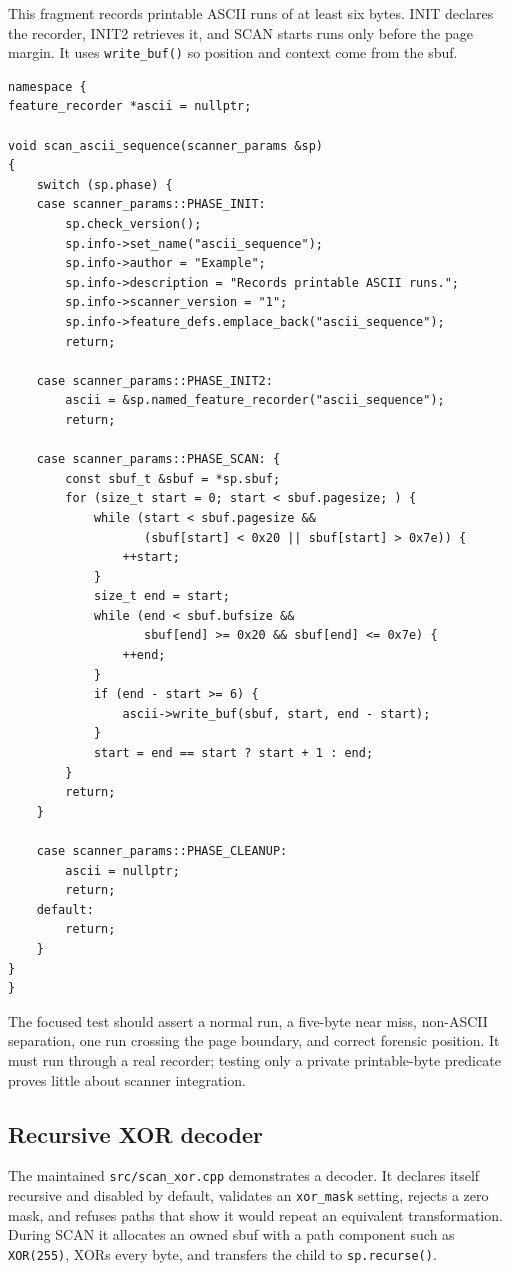 \documentclass[11pt]{article}
\newcommand{\code}[1]{\texttt{#1}}
\begin{document}
This fragment records printable ASCII runs of at least six bytes. INIT declares
the recorder, INIT2 retrieves it, and SCAN starts runs only before the page
margin. It uses \code{write\_buf()} so position and context come from the sbuf.

\begin{Verbatim}[fontsize=\small]
namespace {
feature_recorder *ascii = nullptr;

void scan_ascii_sequence(scanner_params &sp)
{
    switch (sp.phase) {
    case scanner_params::PHASE_INIT:
        sp.check_version();
        sp.info->set_name("ascii_sequence");
        sp.info->author = "Example";
        sp.info->description = "Records printable ASCII runs.";
        sp.info->scanner_version = "1";
        sp.info->feature_defs.emplace_back("ascii_sequence");
        return;

    case scanner_params::PHASE_INIT2:
        ascii = &sp.named_feature_recorder("ascii_sequence");
        return;

    case scanner_params::PHASE_SCAN: {
        const sbuf_t &sbuf = *sp.sbuf;
        for (size_t start = 0; start < sbuf.pagesize; ) {
            while (start < sbuf.pagesize &&
                   (sbuf[start] < 0x20 || sbuf[start] > 0x7e)) {
                ++start;
            }
            size_t end = start;
            while (end < sbuf.bufsize &&
                   sbuf[end] >= 0x20 && sbuf[end] <= 0x7e) {
                ++end;
            }
            if (end - start >= 6) {
                ascii->write_buf(sbuf, start, end - start);
            }
            start = end == start ? start + 1 : end;
        }
        return;
    }

    case scanner_params::PHASE_CLEANUP:
        ascii = nullptr;
        return;
    default:
        return;
    }
}
}
\end{Verbatim}

The focused test should assert a normal run, a five-byte near miss, non-ASCII
separation, one run crossing the page boundary, and correct forensic position.
It must run through a real recorder; testing only a private printable-byte
predicate proves little about scanner integration.

\subsection{Recursive XOR decoder}

The maintained \code{src/scan\_xor.cpp} demonstrates a decoder. It declares
itself recursive and disabled by default, validates an \code{xor\_mask}
setting, rejects a zero mask, and refuses paths that show it would repeat an
equivalent transformation. During SCAN it allocates an owned sbuf with a path
component such as \code{XOR(255)}, XORs every byte, and transfers the child to
\code{sp.recurse()}.
\end{document}
